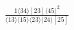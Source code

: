 \documentclass[varwidth, border=5pt]{standalone}
\begin{document}
\begin{my}
$\begin{gathered}
\scriptscriptstyle\frac{1⟨34⟩[23]⟨45⟩^2}{⟨13⟩⟨15⟩⟨23⟩⟨24⟩[25]}
\end{gathered}$
\end{my}
\end{document}
